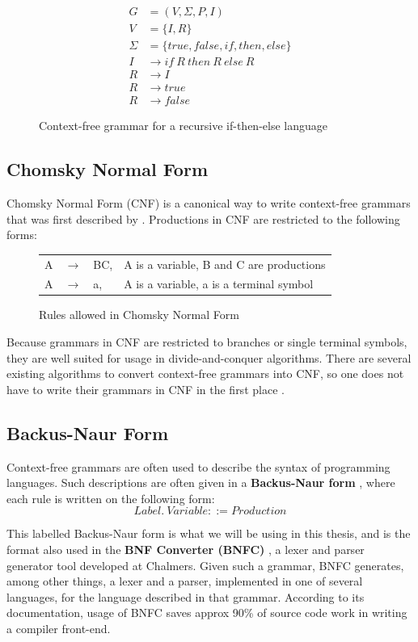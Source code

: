 \documentclass[a4paper,12pt,twosided]{report}
\renewcommand\cite{\citep}
\begin{document}
\begin{figure}[H]
\begin{align*}
G &= (V, \Sigma , P, I) \\
V &= \{I,R\} \\
\Sigma &= \{true,false,if,then,else\} \\
I &\rightarrow if\ R\ then\ R\ else\ R \\
R &\rightarrow I \\
R &\rightarrow true \\
R &\rightarrow false
\end{align*}
\caption{Context-free grammar for a recursive if-then-else language}
\label{iflang}
\end{figure}

\subsection{Chomsky Normal Form}
Chomsky Normal Form (CNF) is a canonical way to write context-free grammars that
was first described by \citet{synstruct}. Productions in CNF are restricted to
the following forms:

\begin{figure}[H]
\begin{tabular}{l l l l}
    A & $\rightarrow$ & BC, & A is a variable, B and C are productions \\
    A & $\rightarrow$ & a, & A is a variable, a is a terminal symbol \\
\end{tabular}
\caption{Rules allowed in Chomsky Normal Form}
\end{figure}
Because grammars in CNF are restricted to branches or single terminal symbols,
they are well suited for usage in divide-and-conquer algorithms. There are
several existing algorithms to convert context-free grammars into CNF, so one
does not have to write their grammars in CNF in the first place \cite{langeleiss}.

\subsection{Backus-Naur Form}
Context-free grammars are often used to describe the syntax of programming
languages. Such descriptions are often given in a \textbf{Backus-Naur form}
\cite{backusform}, where each rule is written on the following form:
\[
Label.\ Variable ::= Production 
\]

This labelled Backus-Naur form is what we will be using in this thesis, and is
the format also used in the \textbf{BNF Converter (BNFC)} \cite{bnfc}, a lexer
and parser generator tool developed at Chalmers.  Given such a grammar, BNFC
generates, among other things, a lexer and a parser, implemented in one of
several languages, for the language described in that grammar. According to its
documentation, usage of BNFC saves approx 90\% of source code work in writing a
compiler front-end. 
\end{document}

